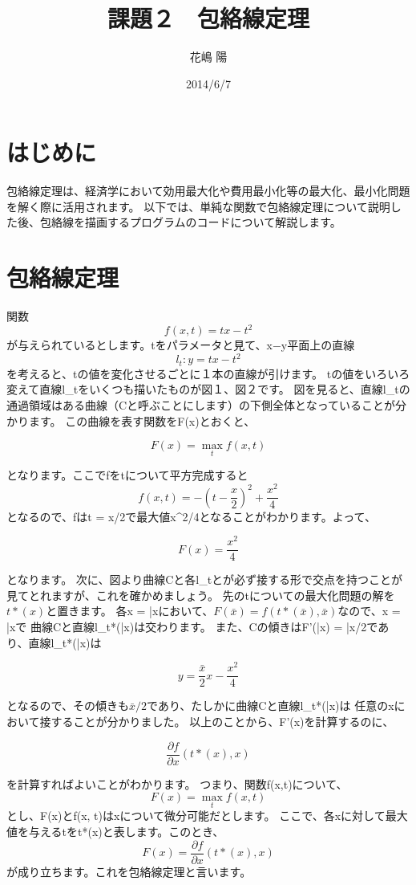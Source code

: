 \documentclass[11pt,a4j,fleqn]{jarticle}
\title{課題２　包絡線定理}
\author{花嶋 陽}
\date{2014/6/7}
\begin{document}
\maketitle

\section{はじめに}
包絡線定理は、経済学において効用最大化や費用最小化等の最大化、最小化問題を解く際に活用されます。
以下では、単純な関数で包絡線定理について説明した後、包絡線を描画するプログラムのコードについて解説します。



\section{包絡線定理}

関数
\[
f(x, t) = t x - t^2
\]
が与えられているとします。tをパラメータと見て、x−y平面上の直線
\[
l_t:y = t x - t^2
\]
を考えると、tの値を変化させるごとに１本の直線が引けます。
tの値をいろいろ変えて直線l_tをいくつも描いたものが図１、図２です。
図を見ると、直線l_tの通過領域はある曲線（Cと呼ぶことにします）の下側全体となっていることが分かります。
この曲線を表す関数をF(x)とおくと、

\[
F(x) = \max_tf(x, t)                                
\]

となります。ここでfをtについて平方完成すると
\[
f(x, t) = -\left(t - \frac{x}{2}\right)^2 + \frac{x^2}{4}
\]
となるので、fはt = x/2で最大値x^2/4となることがわかります。よって、

\[
F(x) = \frac{x^2}{4}
\]

となります。
次に、図より曲線Cと各l_tとが必ず接する形で交点を持つことが見てとれますが、これを確かめましょう。
先のtについての最大化問題の解を$t*(x)$と置きます。
各x = \bar{x}において、$F(\bar{x}) = f(t*(\bar{x}), \bar{x})$なので、x = \bar{x}で
曲線Cと直線l_{t*(\bar{x})}は交わります。
また、Cの傾きはF'(\bar{x}) = \bar{x}/2であり、直線l_{t*(\bar{x})}は

\[
y = \frac{\bar{x}}{2}x - \frac{x^2}{4}
\]

となるので、その傾きも$\bar{x}/2$であり、たしかに曲線Cと直線l_{t*(\bar{x})}は
任意のxにおいて接することが分かりました。
以上のことから、F'(x)を計算するのに、

\[
\frac{\partial f}{\partial x}(t*(x), x)
\]

を計算すればよいことがわかります。
つまり、関数f(x,t)について、
\[
F(x) = \max_tf(x, t)
\]
とし、F(x)とf(x, t)はxについて微分可能だとします。
ここで、各xに対して最大値を与えるtをt*(x)と表します。このとき、
\[
F(x) = \frac{\partial f}{\partial x}(t*(x), x)
\]
が成り立ちます。これを包絡線定理と言います。
\end{document}
